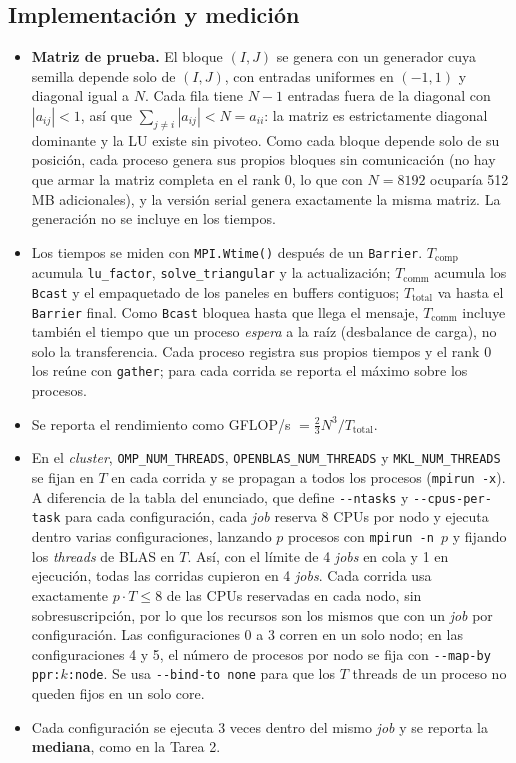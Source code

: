 \documentclass[11pt,a4paper]{article}
\newcommand{\Tcomp}{T_{\text{comp}}}
\newcommand{\Tcomm}{T_{\text{comm}}}
\newcommand{\Ttot}{T_{\text{total}}}
\begin{document}
\subsection{Implementación y medición}
\begin{itemize}
  \item \textbf{Matriz de prueba.} El bloque $(I,J)$ se genera con un generador cuya semilla depende solo de $(I,J)$, con entradas uniformes en $(-1,1)$ y diagonal igual a $N$. Cada fila tiene $N-1$ entradas fuera de la diagonal con $|a_{ij}|<1$, así que $\sum_{j\ne i}|a_{ij}|<N=a_{ii}$: la matriz es estrictamente diagonal dominante y la LU existe sin pivoteo. Como cada bloque depende solo de su posición, cada proceso genera sus propios bloques sin comunicación (no hay que armar la matriz completa en el rank 0, lo que con $N=8192$ ocuparía 512 MB adicionales), y la versión serial genera exactamente la misma matriz. La generación no se incluye en los tiempos.
  \item Los tiempos se miden con \texttt{MPI.Wtime()} después de un \texttt{Barrier}. $\Tcomp$ acumula \texttt{lu\_factor}, \texttt{solve\_triangular} y la actualización; $\Tcomm$ acumula los \texttt{Bcast} y el empaquetado de los paneles en buffers contiguos; $\Ttot$ va hasta el \texttt{Barrier} final. Como \texttt{Bcast} bloquea hasta que llega el mensaje, $\Tcomm$ incluye también el tiempo que un proceso \emph{espera} a la raíz (desbalance de carga), no solo la transferencia. Cada proceso registra sus propios tiempos y el rank 0 los reúne con \texttt{gather}; para cada corrida se reporta el máximo sobre los procesos.
  \item Se reporta el rendimiento como GFLOP/s $=\tfrac{2}{3}N^3/\Ttot$.
  \item En el \emph{cluster}, \texttt{OMP\_NUM\_THREADS}, \texttt{OPENBLAS\_NUM\_THREADS} y \texttt{MKL\_NUM\_THREADS} se fijan en $T$ en cada corrida y se propagan a todos los procesos (\texttt{mpirun -x}). A diferencia de la tabla del enunciado, que define \texttt{-{}-ntasks} y \texttt{-{}-cpus-per-task} para cada configuración, cada \emph{job} reserva 8 CPUs por nodo y ejecuta dentro varias configuraciones, lanzando $p$ procesos con \texttt{mpirun -n $p$} y fijando los \emph{threads} de BLAS en $T$. Así, con el límite de 4 \emph{jobs} en cola y 1 en ejecución, todas las corridas cupieron en 4 \emph{jobs}. Cada corrida usa exactamente $p\cdot T\le8$ de las CPUs reservadas en cada nodo, sin sobresuscripción, por lo que los recursos son los mismos que con un \emph{job} por configuración. Las configuraciones 0 a 3 corren en un solo nodo; en las configuraciones 4 y 5, el número de procesos por nodo se fija con \texttt{-{}-map-by ppr:$k$:node}. Se usa \texttt{-{}-bind-to none} para que los $T$ threads de un proceso no queden fijos en un solo core.
  \item Cada configuración se ejecuta 3 veces dentro del mismo \emph{job} y se reporta la \textbf{mediana}, como en la Tarea 2.
\end{itemize}
\end{document}
